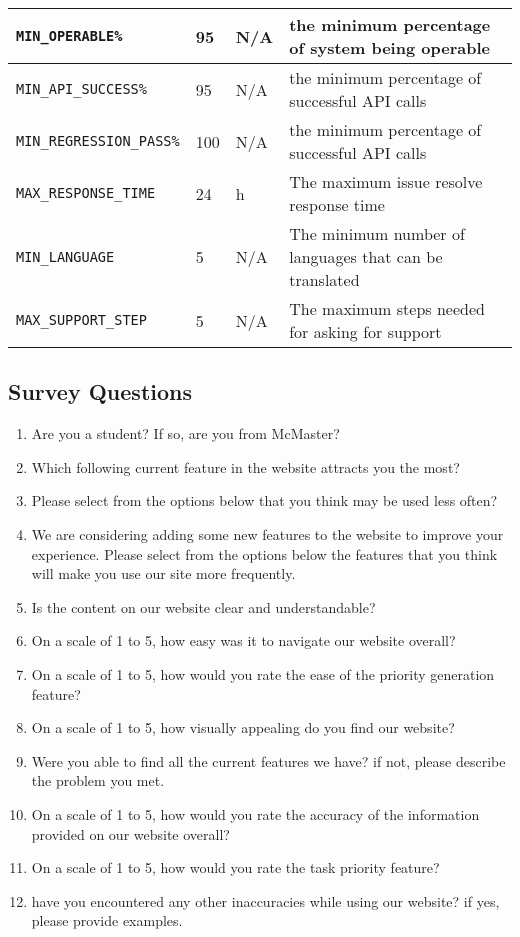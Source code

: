 \documentclass[12pt, titlepage]{article}
\begin{document}
\begin{enumerate}
\begin{longtable}{|l|l|l|p{5cm}|}
\hline
\texttt{MIN\_OPERABLE\%}\label{MIN_OPERABLE} & 95 & N/A & the minimum percentage of system being operable \\
\hline
\texttt{MIN\_API\_SUCCESS\%}\label{MIN_API_SUCCESS} & 95 & N/A &  the minimum percentage of successful API calls\\
\hline
\texttt{MIN\_REGRESSION\_PASS\%}\label{MIN_REGRESSION_PASS} & 100  & N/A &  the minimum percentage of successful API calls\\
\hline
\texttt{MAX\_RESPONSE\_TIME}\label{MAX_RESPONSE_TIME} & 24 & h & The maximum issue resolve response time\\
\hline
\texttt{MIN\_LANGUAGE}\label{MIN_LANGUAGE} & 5& N/A & The minimum number of languages that can be translated\\
\hline
\texttt{MAX\_SUPPORT\_STEP}\label{MAX_SUPPORT_STEP} & 5&N/A& The maximum steps needed for asking for support\\

\hline
\end{longtable}

\subsection{Survey Questions}

\begin{enumerate}
  \item Are you a student? If so, are you from McMaster?
  \item Which following current feature in the website attracts you the most?
  \item Please select from the options below that you think may be used less often?
  \item We are considering adding some new features to the website to improve your experience. Please select from the options below the features that you think will make you use our site more frequently.
  \item Is the content on our website clear and understandable?
  \item On a scale of 1 to 5, how easy was it to navigate our website overall?
  \item On a scale of 1 to 5, how would you rate the ease of the priority generation feature?
  \item On a scale of 1 to 5, how visually appealing do you find our website?
  \item Were you able to find all the current features we have? if not, please describe the problem you met.
  \item On a scale of 1 to 5, how would you rate the accuracy of the information provided on our website overall?
  \item On a scale of 1 to 5, how would you rate the task priority feature?
  \item have you encountered any other inaccuracies while using our website? if yes, please provide examples.
\end{enumerate}


\end{enumerate}
\end{document}
